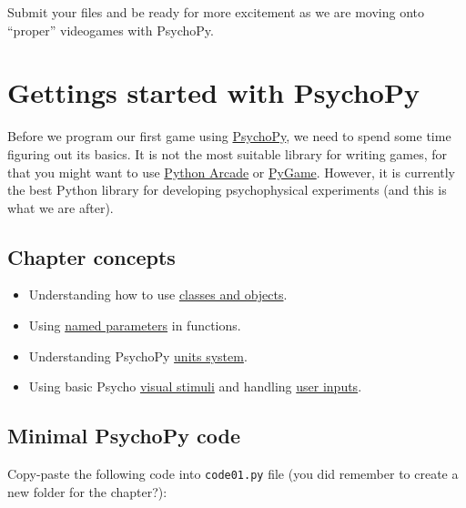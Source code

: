 \documentclass[
]{book}
\providecommand{\tightlist}{%
  \setlength{\itemsep}{0pt}\setlength{\parskip}{0pt}}
\begin{document}
Submit your files and be ready for more excitement as we are moving onto ``proper'' videogames with PsychoPy.

\hypertarget{psychopy-basics}{%
\chapter{Gettings started with PsychoPy}\label{psychopy-basics}}

Before we program our first game using \href{https://psychopy.org/}{PsychoPy}, we need to spend some time figuring out its basics. It is not the most suitable library for writing games, for that you might want to use \href{https://arcade.academy/}{Python Arcade} or \href{https://www.pygame.org/}{PyGame}. However, it is currently the best Python library for developing psychophysical experiments (and this is what we are after).

\hypertarget{chapter-concepts-3}{%
\section{Chapter concepts}\label{chapter-concepts-3}}

\begin{itemize}
\tightlist
\item
  Understanding how to use \protect\hyperlink{classes-and-objects}{classes and objects}.
\item
  Using \protect\hyperlink{arguments-by-position-or-name}{named parameters} in functions.
\item
  Understanding PsychoPy \protect\hyperlink{psychopy-units}{units system}.
\item
  Using basic Psycho \protect\hyperlink{adding-text-message}{visual stimuli} and handling \protect\hyperlink{make-the-square-jump-on-your-command}{user inputs}.
\end{itemize}

\hypertarget{minimal-psychopy}{%
\section{Minimal PsychoPy code}\label{minimal-psychopy}}

Copy-paste the following code into \texttt{code01.py} file (you did remember to create a new folder for the chapter?):
\end{document}
